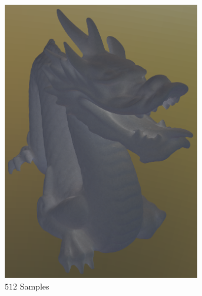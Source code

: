 		\begin{figure}
			\begin{subfigure}[b]{0.33\textwidth}
				\center
				\includegraphics[width=0.95\textwidth]{pic/irr_est-rc-dragon2-s512-err.png}
				\caption{$512$ Samples}
			\end{subfigure}
			\begin{subfigure}[b]{0.33\textwidth}
				\center

\end{subfigure}
\end{figure}
